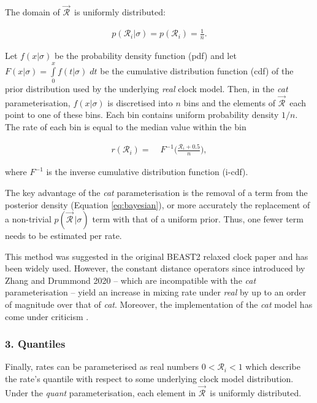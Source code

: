 \documentclass[10pt,letterpaper]{article}
\begin{document}
The domain of $\vec{\mathcal{R}}^{\,}$ is uniformly distributed:


\begin{align}
p(\mathcal{R}_i | \sigma) = p(\mathcal{R}_i) = \frac{1}{n}.
\end{align}



Let $f(x|\sigma)$ be the probability density function (pdf) and let $F(x|\sigma) = \int\limits_{0}^{x} f(t|\sigma) \; dt$ be the cumulative distribution function (cdf) of the prior distribution used by the underlying \textit{real} clock model. Then, in the \textit{cat} parameterisation, $f(x|\sigma)$ is discretised into $n$ bins and the elements of $\vec{\mathcal{R}}^{\,}$ each point to one of these bins. Each bin contains uniform probability density $1/n$. The rate of each bin is equal to the median value within the bin 


\begin{align}
r(\mathcal{R}_i) =& \; F^{-1}\big(\frac{\mathcal{R}_i + 0.5}{n}\big),
\end{align}

where $F^{-1}$ is the inverse cumulative distribution function (i-cdf).



The key advantage of the \textit{cat} parameterisation is the removal of a term from the posterior density (Equation \ref{eq:bayesian}), or more accurately the replacement of a non-trivial $p(\vec{\mathcal{R}}^{\,} | \sigma)$ term with that of a uniform prior. Thus, one fewer term needs to be estimated per rate.



This method was suggested in the original BEAST2 relaxed clock paper \cite{drummond2006relaxed} and has been widely used. However, the constant distance operators since introduced by Zhang and Drummond 2020 -- which are incompatible with the \textit{cat} parameterisation -- yield an increase in mixing rate under \textit{real} by up to an order of magnitude over that of \textit{cat}. Moreover, the implementation of the \textit{cat} model has come under criticism \cite{rannala2007inferring}.






\subsubsection*{3. Quantiles}


Finally, rates can be parameterised as real numbers $0 < \mathcal{R}_i < 1$ which describe the rate's quantile with respect to some underlying clock model distribution. Under the  \textit{quant} parameterisation, each element in $\vec{\mathcal{R}}^{\,}$ is uniformly distributed.
\end{document}
